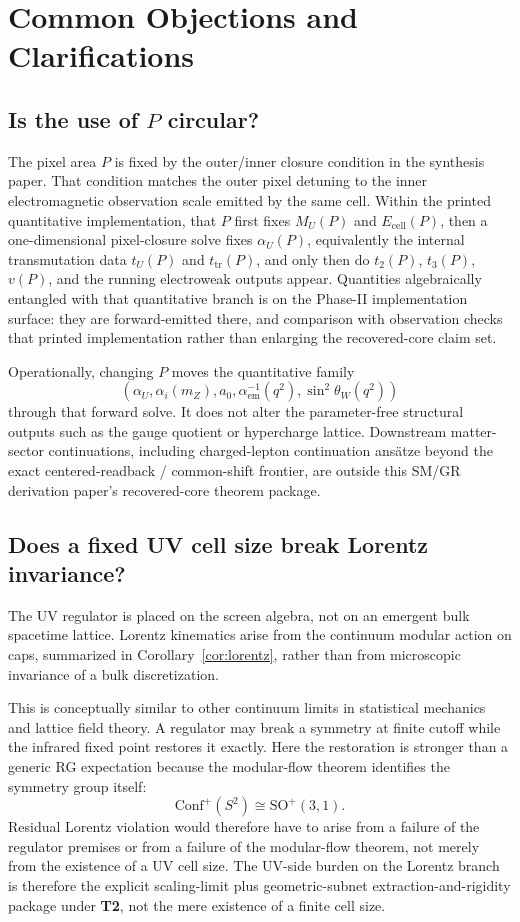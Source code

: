\documentclass[11pt]{article}
\newcommand{\Conf}{\mathrm{Conf}}
\begin{document}
\section{Common Objections and Clarifications}

\subsection{\texorpdfstring{Is the use of $P$ circular?}{Is the use of P circular?}}

The pixel area \(P\) is fixed by the outer/inner closure condition in the synthesis paper. That
condition matches the outer pixel detuning to the inner electromagnetic observation scale emitted
by the same cell. Within the printed quantitative implementation, that \(P\) first fixes \(M_U(P)\) and \(E_{\mathrm{cell}}(P)\), then a
one-dimensional pixel-closure solve fixes \(\alpha_U(P)\), equivalently the internal transmutation
data \(t_U(P)\) and \(t_{\mathrm{tr}}(P)\), and only then do \(t_2(P)\), \(t_3(P)\), \(v(P)\), and
the running electroweak outputs appear. Quantities algebraically entangled with that quantitative
branch is on the Phase-II implementation surface: they are forward-emitted there, and
comparison with observation checks that printed implementation rather than enlarging the
recovered-core claim set.

Operationally, changing \(P\) moves the quantitative family
\[
(\alpha_U,\alpha_i(m_Z),a_0,\alpha_{\mathrm{em}}^{-1}(q^2),\sin^2\theta_W(q^2))
\]
through that forward solve. It does not alter the parameter-free structural outputs such as the
gauge quotient or hypercharge lattice. Downstream matter-sector continuations, including
charged-lepton continuation ans\"atze beyond the exact centered-readback / common-shift frontier,
are outside this SM/GR derivation paper's recovered-core theorem package.

\subsection{Does a fixed UV cell size break Lorentz invariance?}

The UV regulator is placed on the screen algebra, not on an emergent bulk spacetime lattice. Lorentz kinematics arise from the continuum modular action on caps, summarized in Corollary~\ref{cor:lorentz}, rather than from microscopic invariance of a bulk discretization.

This is conceptually similar to other continuum limits in statistical mechanics and lattice field theory. A regulator may break a symmetry at finite cutoff while the infrared fixed point restores it exactly. Here the restoration is stronger than a generic RG expectation because the modular-flow theorem identifies the symmetry group itself:
\[
\Conf^+(S^2)\cong \mathrm{SO}^+(3,1).
\]
Residual Lorentz violation would therefore have to arise from a failure of the regulator premises or from a failure of the modular-flow theorem, not merely from the existence of a UV cell size.
The UV-side burden on the Lorentz branch is therefore the explicit scaling-limit plus geometric-subnet extraction-and-rigidity package under \textbf{T2}, not the mere existence of a finite cell size.
\end{document}
